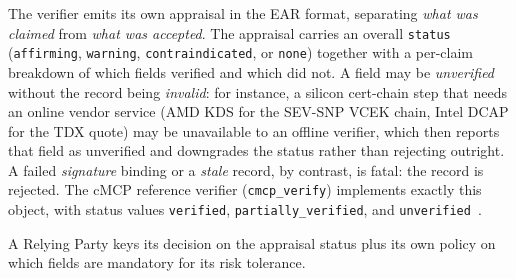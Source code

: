 The verifier emits its own appraisal in the EAR format, separating \emph{what was
claimed} from \emph{what was accepted}. The appraisal carries an overall
\texttt{status} (\texttt{affirming}, \texttt{warning}, \texttt{contraindicated},
or \texttt{none}) together with a per-claim breakdown of which fields verified and
which did not. A field may be \emph{unverified} without the record being
\emph{invalid}: for instance, a silicon cert-chain step that needs an online vendor
service (AMD KDS for the SEV-SNP VCEK chain, Intel DCAP for the TDX quote) may be
unavailable to an offline verifier, which then reports that field as unverified and
downgrades the status rather than rejecting outright. A failed \emph{signature}
binding or a \emph{stale} record, by contrast, is fatal: the record is rejected. The
cMCP reference verifier (\texttt{cmcp\_verify}) implements exactly this object, with
status values \texttt{verified}, \texttt{partially\_verified}, and
\texttt{unverified}~\citep{cmcp2026}.

A Relying Party keys its decision on the appraisal status plus its own policy on
which fields are mandatory for its risk tolerance.
